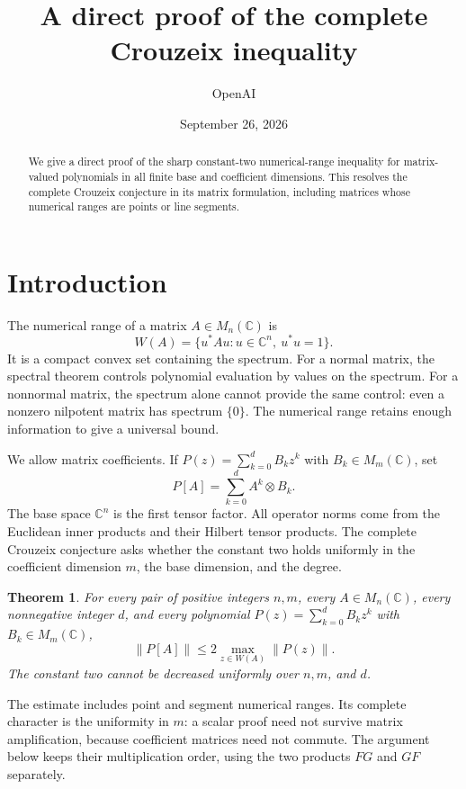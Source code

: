 \documentclass[11pt]{article}
\title{A direct proof of the complete Crouzeix inequality}
\author{OpenAI}
\date{September 26, 2026}
\newcommand{\C}{\mathbb C}
\newtheorem{theorem}{Theorem}[section]
\theoremstyle{remark}\newtheorem{remark}[theorem]{Remark}
\numberwithin{equation}{section}
\begin{document}
\maketitle
\begin{abstract}
We give a direct proof of the sharp constant-two numerical-range inequality
for matrix-valued polynomials in all finite base and coefficient dimensions.
This resolves the complete Crouzeix conjecture in its matrix formulation,
including matrices whose numerical ranges are points or line segments.
\end{abstract}
\section{Introduction}\label{sec:intro}
The numerical range of a matrix $A\in M_n(\C)$ is
\[
 W(A)=\{u^*Au:u\in\C^n,\ u^*u=1\}.
\]
It is a compact convex set containing the spectrum. For a normal matrix,
the spectral theorem controls polynomial evaluation by values on the
spectrum. For a nonnormal matrix, the spectrum alone cannot provide the
same control: even a nonzero nilpotent matrix has spectrum $\{0\}$.
The numerical range retains enough information to give a universal bound.

We allow matrix coefficients. If
$P(z)=\sum_{k=0}^d B_kz^k$ with $B_k\in M_m(\C)$, set
\[
 P[A]=\sum_{k=0}^d A^k\otimes B_k.
\]
The base space $\C^n$ is the first tensor factor. All operator norms
come from the Euclidean inner products and their Hilbert tensor products.
The complete Crouzeix conjecture asks whether the constant two holds
uniformly in the coefficient dimension $m$, the base dimension, and the degree.

\begin{theorem}\label{thm:main}
For every pair of positive integers $n,m$, every $A\in M_n(\C)$,
every nonnegative integer $d$, and every polynomial
$P(z)=\sum_{k=0}^d B_kz^k$ with $B_k\in M_m(\C)$,
\begin{equation}\label{eq:main}
 \|P[A]\|\le2\max_{z\in W(A)}\|P(z)\|.
\end{equation}
The constant two cannot be decreased uniformly over $n,m$, and $d$.
\end{theorem}

The estimate includes point and segment numerical ranges. Its complete
character is the uniformity in $m$: a scalar proof need not survive
matrix amplification, because coefficient matrices need not commute.
The argument below keeps their multiplication order, using the two
products $FG$ and $GF$ separately.
\end{document}
